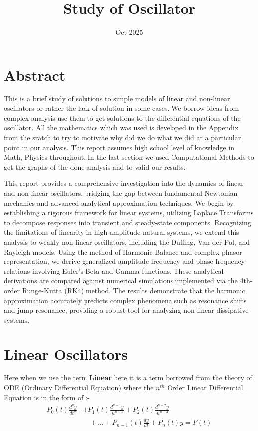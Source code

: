 \documentclass[10pt,twoside]{report}
\title{Study of Oscillator}
\author{}
\date{Oct 2025}
\begin{document}
\maketitle
\tableofcontents
\listoffigures
\newpage

\chapter*{Abstract}
This is a brief study of solutions to simple models of linear and non-linear oscillators or rather the lack of solution in some cases. We borrow ideas from complex analysis use them to get solutions to the differential equations of the oscillator. All the mathematics which was used is developed in the Appendix from the sratch to try to motivate why did we do what we did at a particular point in our analysis. This report assumes high school level of knowledge in Math, Physics throughout. In the last section we used Computational Methods to get the graphs of the done analysis and to valid our results. 

This report provides a comprehensive investigation into the dynamics of linear and non-linear oscillators, bridging the gap between fundamental Newtonian mechanics and advanced analytical approximation techniques. We begin by establishing a rigorous framework for linear systems, utilizing Laplace Transforms to decompose responses into transient and steady-state components. Recognizing the limitations of linearity in high-amplitude natural systems, we extend this analysis to weakly non-linear oscillators, including the Duffing, Van der Pol, and Rayleigh models. Using the method of Harmonic Balance and complex phasor representation, we derive generalized amplitude-frequency and phase-frequency relations involving Euler’s Beta and Gamma functions. These analytical derivations are compared against numerical simulations implemented via the 4th-order Runge-Kutta (RK4) method. The results demonstrate that the harmonic approximation accurately predicts complex phenomena such as resonance shifts and jump resonance, providing a robust tool for analyzing non-linear dissipative systems. 
\chapter{Linear Oscillators}
Here when we use the term \textbf{Linear} here it is a term borrowed from the theory of ODE (Ordinary Differential Equation) where the $n^{th}$ Order Linear Differential Equation is in the form of :-
\begin{equation}
\begin{split}
\label{gen_nth_ode}
P_0(t) \frac{d^ny}{dt^n} &+ P_1(t) \frac{d^{n-1}y}{dt^{n-1}} + P_2(t) \frac{d^{n-2}y}{dt^{n-2}} \\
&\quad + \ldots + P_{n-1}(t) \frac{dy}{dt} + P_n(t)y = F(t)
\end{split}
\end{equation}
\end{document}

